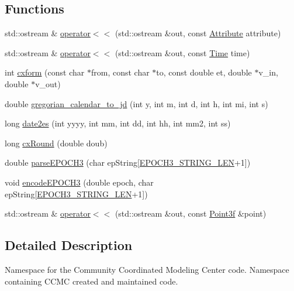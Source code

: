 \subsection*{Functions}
\begin{DoxyCompactItemize}
\item 
std\-::ostream \& \hyperlink{namespaceccmc_ad811f4e9ac8644fea4054b81aabbb072}{operator$<$$<$} (std\-::ostream \&out, const \hyperlink{classccmc_1_1_attribute}{Attribute} attribute)
\item 
std\-::ostream \& \hyperlink{namespaceccmc_a5d0e418affc4de3b52af1ad91b58a03f}{operator$<$$<$} (std\-::ostream \&out, const \hyperlink{classccmc_1_1_time}{Time} time)
\item 
int \hyperlink{namespaceccmc_a89959a8566a58d1e6c000d742304be1b}{cxform} (const char $\ast$from, const char $\ast$to, const double et, double $\ast$v\-\_\-in, double $\ast$v\-\_\-out)
\item 
double \hyperlink{namespaceccmc_ae9b36fc97f95279e8815455b796fb78f}{gregorian\-\_\-calendar\-\_\-to\-\_\-jd} (int y, int m, int d, int h, int mi, int s)
\item 
long \hyperlink{namespaceccmc_a2bcda52133fe790c98ff1e09e0d8feef}{date2es} (int yyyy, int mm, int dd, int hh, int mm2, int ss)
\item 
long \hyperlink{namespaceccmc_acbeec2fb0bdcdbe669f213d20cb5d3ac}{cx\-Round} (double doub)
\item 
double \hyperlink{namespaceccmc_a17625a00cb5c6d62f957839dcfabf7dd}{parse\-E\-P\-O\-C\-H3} (char ep\-String\mbox{[}\hyperlink{_kameleon_8h_a6f9c7e3353c7eb6333adaa96be43edab}{E\-P\-O\-C\-H3\-\_\-\-S\-T\-R\-I\-N\-G\-\_\-\-L\-E\-N}+1\mbox{]})
\item 
void \hyperlink{namespaceccmc_a07dfb0ccd6e3ff58181ad54f151e1c3a}{encode\-E\-P\-O\-C\-H3} (double epoch, char ep\-String\mbox{[}\hyperlink{_kameleon_8h_a6f9c7e3353c7eb6333adaa96be43edab}{E\-P\-O\-C\-H3\-\_\-\-S\-T\-R\-I\-N\-G\-\_\-\-L\-E\-N}+1\mbox{]})
\item 
std\-::ostream \& \hyperlink{namespaceccmc_a447a43508de96a63d12aae7c85aaa06b}{operator$<$$<$} (std\-::ostream \&out, const \hyperlink{classccmc_1_1_point3f}{Point3f} \&point)
\end{DoxyCompactItemize}


\subsection{Detailed Description}
Namespace for the Community Coordinated Modeling Center code. Namespace containing C\-C\-M\-C created and maintained code.


